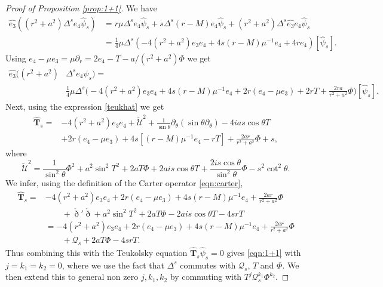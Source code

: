 \documentclass[reqno]{amsart}
\numberwithin{equation}{section}
\newcommand{\teukhat}{\widehat{\teuk}}
\newcommand{\mcq}{\mathcal{Q}}
\newcommand{\drond}{\mathring{\eth}}
\newcommand{\teuk}{\mathbf{T}}
\newcommand{\psihat}{\widehat{\psi}}
\newcommand{\ethat}{\widehat{e_3}}
\theoremstyle{plain}
\theoremstyle{definition}
\theoremstyle{remark}
\numberwithin{equation}{section}
\begin{document}
\begin{proof}[Proof of Proposition \ref{prop:1+1}]
    We have 
    \begin{align*}
        \ethat((r^2+a^2)\Delta^se_4\psihat_s)&=r\mu\Delta^s e_4\psihat_s+s\Delta^s(r-M)e_4\psihat_s+(r^2+a^2)\Delta^s \ethat e_4\psihat_s\\
        &=\frac{1}{4}\mu\Delta^s(-4(r^2+a^2)e_3e_4+4s(r-M)\mu^{-1}e_4+4re_4)[\psihat_s].
    \end{align*}
Using $e_4-\mu e_3=\mu\partial_r=2e_4-T-a/(r^2+a^2)\Phi$ we get
    \begin{align*}
        \ethat((r^2+a^2)&\Delta^s e_4\psihat_s)=\\
        &\frac{1}{4}\mu\Delta^s\Bigg(-4(r^2+a^2)e_3e_4+4s(r-M)\mu^{-1}e_4+2r(e_4-\mu e_3)+2r T+\frac{2ra}{r^2+a^2}\Phi\Bigg)[\psihat_s].
    \end{align*}
Next, using the expression \eqref{teukhat} we get
    \begin{align*}
    \teukhat_{s}=&-4(r^2+a^2)e_3e_4+ \widetilde{\mathcal{U}}^2+\frac{1}{\sin\theta}\partial_\theta(\sin\theta\partial_\theta)-4ias\cos\theta T\\
    &+2 r (e_4-\mu e_3)+4s[(r-M)\mu^{-1}e_4- rT]+\frac{2ar }{r^2+a^2}\Phi+ s,
\end{align*}
where 
$$\widetilde{\mathcal{U}}^2=\frac{1}{\sin^2\theta}\Phi^2+a^2\sin^2 T^2+2a T\Phi+2ais\cos\theta T+\frac{2is\cos\theta}{\sin^2\theta}\Phi-s^2\cot^2\theta.$$
We infer, using the definition of the Carter operator \eqref{eqn:carter},
    \begin{align*}
    \teukhat_{s}=&-4(r^2+a^2)e_3e_4+2 r (e_4-\mu e_3)+4s(r-M)\mu^{-1}e_4+\frac{2ar }{r^2+a^2}\Phi\\
    &\quad\quad+\drond'\drond+a^2\sin^2 T^2+2aT\Phi-2ais\cos\theta T-4srT\\
    &=-4(r^2+a^2)e_3e_4+2 r (e_4-\mu e_3)+4s(r-M)\mu^{-1}e_4+\frac{2ar }{r^2+a^2}\Phi\\
    &\quad\quad+\mcq_{s}+2aT\Phi-4srT.
\end{align*}
Thus combining this with the Teukolsky equation $\teukhat_{s}\psihat_s=0$ gives \eqref{eqn:1+1} with $j=k_1=k_2=0$, where we use the fact that $\Delta^s$ commutes with $\mcq_{s}$, $T$ and $\Phi$. We then extend this to general non zero $j,k_1,k_2$ by commuting with $T^j\mcq_s^{k_1}\Phi^{k_2}$.
\end{proof}
\end{document}
